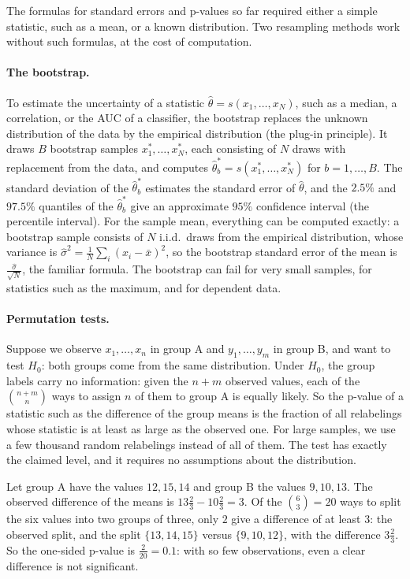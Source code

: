 The formulas for standard errors and p-values so far required either a simple statistic, such as a mean, or a known distribution. Two resampling methods work without such formulas, at the cost of computation.

\paragraph{The bootstrap.} To estimate the uncertainty of a statistic $\hat\theta = s(x_1, \ldots, x_N)$, such as a median, a correlation, or the AUC of a classifier, the bootstrap replaces the unknown distribution of the data by the empirical distribution (the plug-in principle). It draws $B$ bootstrap samples $x_1^*, \ldots, x_N^*$, each consisting of $N$ draws with replacement from the data, and computes $\hat\theta_b^* = s(x_1^*, \ldots, x_N^*)$ for $b = 1, \ldots, B$. The standard deviation of the $\hat\theta_b^*$ estimates the standard error of $\hat\theta$, and the $2.5\%$ and $97.5\%$ quantiles of the $\hat\theta_b^*$ give an approximate $95\%$ confidence interval (the percentile interval). For the sample mean, everything can be computed exactly: a bootstrap sample consists of $N$ i.i.d.\ draws from the empirical distribution, whose variance is $\hat\sigma^2 = \frac{1}{N}\sum_i (x_i - \bar x)^2$, so the bootstrap standard error of the mean is $\frac{\hat\sigma}{\sqrt{N}}$, the familiar formula. The bootstrap can fail for very small samples, for statistics such as the maximum, and for dependent data.

\paragraph{Permutation tests.} Suppose we observe $x_1, \ldots, x_n$ in group A and $y_1, \ldots, y_m$ in group B, and want to test $H_0$: both groups come from the same distribution. Under $H_0$, the group labels carry no information: given the $n + m$ observed values, each of the $\binom{n + m}{n}$ ways to assign $n$ of them to group A is equally likely. So the p-value of a statistic such as the difference of the group means is the fraction of all relabelings whose statistic is at least as large as the observed one. For large samples, we use a few thousand random relabelings instead of all of them. The test has exactly the claimed level, and it requires no assumptions about the distribution.

\begin{example}\label{L4-ex:permutation}
    Let group A have the values $12, 15, 14$ and group B the values $9, 10, 13$. The observed difference of the means is $13\frac{2}{3} - 10\frac{2}{3} = 3$. Of the $\binom{6}{3} = 20$ ways to split the six values into two groups of three, only $2$ give a difference of at least $3$: the observed split, and the split $\{13, 14, 15\}$ versus $\{9, 10, 12\}$, with the difference $3\frac{2}{3}$. So the one-sided p-value is $\frac{2}{20} = 0.1$: with so few observations, even a clear difference is not significant.
\end{example}

